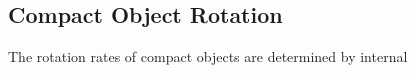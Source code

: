 {\color{orange}

\subsection{Compact Object Rotation}

The rotation rates of compact objects are determined by internal

}